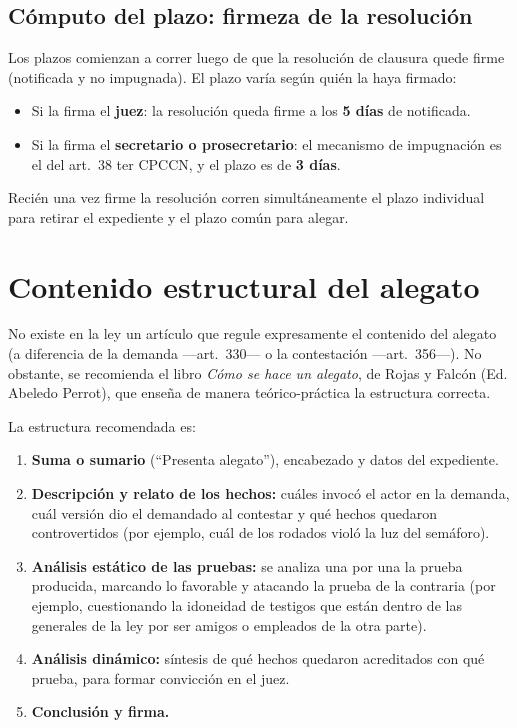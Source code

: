 \documentclass[12pt,oneside]{book}
\begin{document}
\subsection{Cómputo del plazo: firmeza de la resolución}

Los plazos comienzan a correr luego de que la resolución de clausura quede firme (notificada y no impugnada). El plazo varía según quién la haya firmado:

\begin{itemize}
    \item Si la firma el \textbf{juez}: la resolución queda firme a los \textbf{5 días} de notificada.
    \item Si la firma el \textbf{secretario o prosecretario}: el mecanismo de impugnación es el del art.~38 ter CPCCN, y el plazo es de \textbf{3 días}.
\end{itemize}

Recién una vez firme la resolución corren simultáneamente el plazo individual para retirar el expediente y el plazo común para alegar.

\section{Contenido estructural del alegato}

No existe en la ley un artículo que regule expresamente el contenido del alegato (a diferencia de la demanda ---art.~330--- o la contestación ---art.~356---). No obstante, se recomienda el libro \textit{Cómo se hace un alegato}, de Rojas y Falcón (Ed. Abeledo Perrot), que enseña de manera teórico-práctica la estructura correcta.

La estructura recomendada es:

\begin{enumerate}
    \item \textbf{Suma o sumario} (``Presenta alegato''), encabezado y datos del expediente.
    \item \textbf{Descripción y relato de los hechos:} cuáles invocó el actor en la demanda, cuál versión dio el demandado al contestar y qué hechos quedaron controvertidos (por ejemplo, cuál de los rodados violó la luz del semáforo).
    \item \textbf{Análisis estático de las pruebas:} se analiza una por una la prueba producida, marcando lo favorable y atacando la prueba de la contraria (por ejemplo, cuestionando la idoneidad de testigos que están dentro de las generales de la ley por ser amigos o empleados de la otra parte).
    \item \textbf{Análisis dinámico:} síntesis de qué hechos quedaron acreditados con qué prueba, para formar convicción en el juez.
    \item \textbf{Conclusión y firma.}
\end{enumerate}
\end{document}
